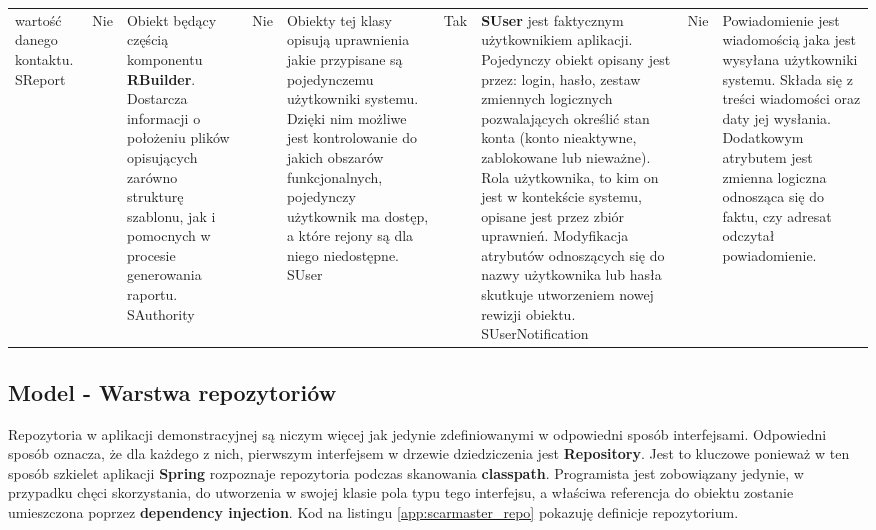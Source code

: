 \begin{center}
\begin{longtable}{| p{4cm} | p{2cm} | p{8cm} |}
			wartość danego kontaktu.
			\hline
			SReport 			&
			Nie					& 
			Obiekt będący częścią komponentu \textbf{RBuilder}. Dostarcza informacji o położeniu plików opisujących zarówno strukturę szablonu, jak i pomocnych w procesie generowania raportu.
			\hline
			SAuthority	 		&
			Nie					& 
			Obiekty tej klasy opisują uprawnienia jakie przypisane są pojedynczemu użytkowniki systemu. Dzięki nim możliwe jest kontrolowanie do jakich obszarów funkcjonalnych, pojedynczy użytkownik ma dostęp, a które
			rejony są dla niego niedostępne. 
			\hline
			SUser 				&
			Tak 				& 
			\textbf{SUser} jest faktycznym użytkownikiem aplikacji. Pojedynczy obiekt opisany jest przez: login, hasło, zestaw zmiennych logicznych pozwalających określić stan konta (konto nieaktywne, zablokowane lub nieważne). Rola użytkownika, to kim on jest w kontekście systemu, opisane jest przez zbiór uprawnień. Modyfikacja atrybutów odnoszących się do nazwy użytkownika lub hasła skutkuje utworzeniem nowej rewizji obiektu. 
			\hline
			SUserNotification 	& 
			Nie 				& 
			Powiadomienie jest wiadomością jaka jest wysyłana użytkowniki systemu. Składa się z treści wiadomości oraz daty jej wysłania. Dodatkowym atrybutem jest zmienna logiczna odnosząca się do faktu, czy adresat odczytał powiadomienie. 
		\end{longtable}
	\end{center}	
	
\subsection{Model - Warstwa repozytoriów}
	Repozytoria w aplikacji demonstracyjnej są niczym więcej jak jedynie zdefiniowanymi w odpowiedni sposób interfejsami. Odpowiedni sposób oznacza, że dla każdego z nich, pierwszym interfejsem w drzewie dziedziczenia jest \textbf{Repository}. Jest to kluczowe ponieważ w ten sposób szkielet aplikacji \textbf{Spring} rozpoznaje repozytoria podczas skanowania \textbf{classpath}. Programista jest zobowiązany jedynie, w przypadku chęci skorzystania, do utworzenia w swojej klasie pola typu tego interfejsu, a właściwa referencja do obiektu zostanie umieszczona poprzez \textbf{dependency injection}. Kod na listingu \ref{app:scarmaster_repo} pokazuję definicje repozytorium. 
	 
